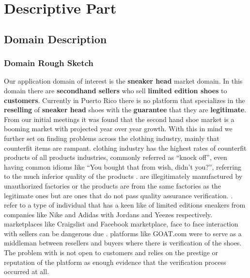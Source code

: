 \chapter{Descriptive Part}
\newpage
\section{Domain Description}
\subsection{Domain Rough Sketch}
Our application domain of interest is the \textbf{sneaker head} market domain. In this domain there are \textbf{secondhand sellers} who sell \textbf{limited edition shoes} to \textbf{customers}. Currently in Puerto Rico there is no platform that specializes in the \textbf{reselling} of \textbf{sneaker head} shoes with the \textbf{guarantee} that they are \textbf{legitimate}. From our initial meetings it was found that the second hand shoe market is a booming market with projected year over year growth. With this in mind we further set on finding problems across the clothing industry, mainly that counterfit items are rampant.  clothing industry has the highest rates of counterfit products of all products industries, commonly referred as ``knock off'', even having common idioms like ``You bought that from wish, didn't you?'', referring to the much inferior quality of the products \cite{InfographicIndustriesMost2019}. are illegitimately manufactured by unauthorized factories or the products are from the same factories as the legitimate ones but are ones that do not pass quality assurance verification. .  refer to a type of individual that has a keen like of limited editions sneakers from companies like Nike and Adidas with Jordans and Yeezes respectively.  marketplaces like Craigslist and Facebook marketplace, face to face interaction with sellers  can be dangerous due .   platforms like GOAT.com were  to serve as a middleman between resellers and buyers where there is  verification of the shoes.  The problem with   is not open to customers and relies on the prestige or reputation of the platform as enough evidence that the verification process occurred at all.
